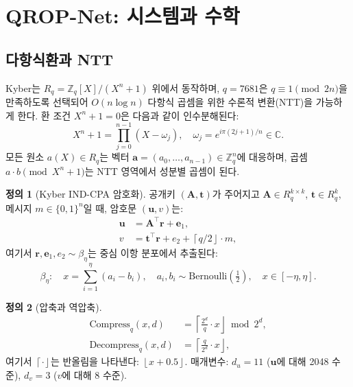 \documentclass[11pt, a4paper]{article}
\theoremstyle{definition}
\newtheorem{definition}{정의}[section]
\theoremstyle{plain}
\newcommand{\Zq}{\mathbb{Z}_q}
\newcommand{\Rq}{\mathbb{Z}_q[X]/(X^n+1)}
\newcommand{\ceil}[1]{\left\lceil#1\right\rfloor}
\newcommand{\floor}[1]{\left\lfloor#1\right\rfloor}
\begin{document}
\section{QROP-Net: 시스템과 수학}
\label{sec:qropnet}

\subsection{다항식환과 NTT}

Kyber는 $R_q = \Rq$ 위에서 동작하며, $q = 7681$은 $q \equiv 1 \pmod{2n}$을 만족하도록 선택되어 $O(n\log n)$ 다항식 곱셈을 위한 수론적 변환(NTT)을 가능하게 한다. 환 조건 $X^n + 1 = 0$은 다음과 같이 인수분해된다:
\begin{equation}
  X^n + 1 = \prod_{j=0}^{n-1}(X - \omega_j), \quad
  \omega_j = e^{i\pi(2j+1)/n} \in \mathbb{C}.
  \label{eq:factorisation}
\end{equation}
모든 원소 $a(X) \in R_q$는 벡터 $\mathbf{a} = (a_0, \ldots, a_{n-1}) \in \Zq^n$에 대응하며, 곱셈 $a \cdot b \pmod{X^n+1}$는 NTT 영역에서 성분별 곱셈이 된다.

\begin{definition}[Kyber IND-CPA 암호화]
\label{def:kyber}
공개키 $(\mathbf{A}, \mathbf{t})$가 주어지고 $\mathbf{A} \in R_q^{k \times k}$, $\mathbf{t} \in R_q^k$, 메시지 $m \in \{0,1\}^n$일 때, 암호문 $(\mathbf{u}, v)$는:
\begin{align}
  \mathbf{u} &= \mathbf{A}^\top \mathbf{r} + \mathbf{e}_1,
  \label{eq:kyber_u}\\
  v &= \mathbf{t}^\top \mathbf{r} + e_2 + \ceil{q/2} \cdot m,
  \label{eq:kyber_v}
\end{align}
여기서 $\mathbf{r}, \mathbf{e}_1, e_2 \sim \beta_\eta$는 중심 이항 분포에서 추출된다:
\begin{equation}
  \beta_\eta: \quad x = \sum_{i=1}^{\eta}(a_i - b_i), \quad
  a_i, b_i \sim \mathrm{Bernoulli}(\tfrac{1}{2}), \quad
  x \in [-\eta, \eta].
  \label{eq:cbd}
\end{equation}
\end{definition}

\begin{definition}[압축과 역압축]
\label{def:compress}
\begin{align}
  \mathrm{Compress}_q(x, d) &= \ceil{\frac{2^d}{q} \cdot x}
  \bmod 2^d, \label{eq:compress}\\
  \mathrm{Decompress}_q(x, d) &= \ceil{\frac{q}{2^d} \cdot x},
  \label{eq:decompress}
\end{align}
여기서 $\ceil{\cdot}$는 반올림을 나타낸다: $\floor{x + 0.5}$.
매개변수: $d_u = 11$ ($\mathbf{u}$에 대해 2048 수준), $d_v = 3$ ($v$에 대해 8 수준).
\end{definition}
\end{document}

